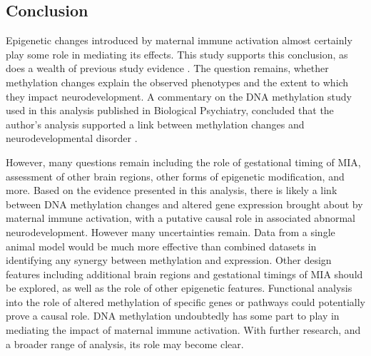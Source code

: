 \documentclass{bioinfo}
\begin{document}
\begin{conclusion}
\section{Conclusion}
Epigenetic changes introduced by maternal immune activation almost certainly play some role in mediating its effects. This study supports this conclusion, as does a wealth of previous study evidence \citep{richetto_genome-wide_2017-1, tang_epigenetic_2013, labouesse_maternal_2015, basil_prenatal_2014}. The question remains, whether methylation changes explain the observed phenotypes and the extent to which they impact neurodevelopment. A commentary on the DNA methylation study used in this analysis published in Biological Psychiatry, concluded that the author's analysis supported a link between methylation changes and neurodevelopmental disorder \citep{kundakovic_fearing_2017}.

However, many questions remain including the role of gestational timing of MIA, assessment of other brain regions, other forms of epigenetic modification, and more. Based on the evidence presented in this analysis, there is likely a link between DNA methylation changes and altered gene expression brought about by maternal immune activation, with a putative causal role in associated abnormal neurodevelopment. However many uncertainties remain. Data from a single animal model would be much more effective than combined datasets in identifying any synergy between methylation and expression. Other design features including additional brain regions and gestational timings of MIA should be explored, as well as the role of other epigenetic features. Functional analysis into the role of altered methylation of specific genes or pathways could potentially prove a causal role. DNA methylation undoubtedly has some part to play in mediating the impact of maternal immune activation. With further research, and a broader range of analysis, its role may become clear.
\end{conclusion}



\end{document}
